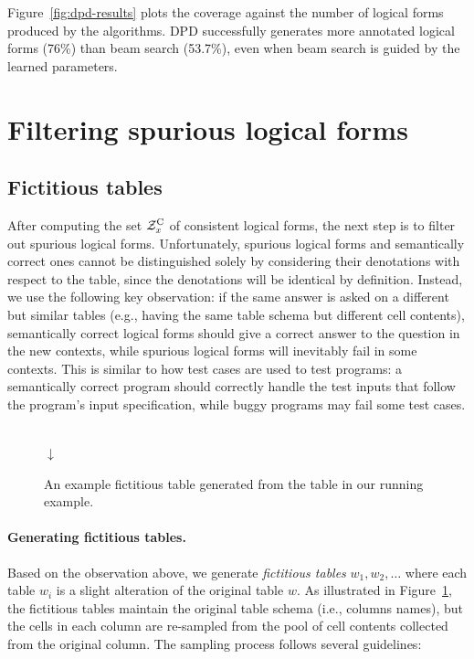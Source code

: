 Figure~\ref{fig:dpd-results}
plots the coverage against the number of logical forms
produced by the algorithms.
DPD successfully generates more annotated logical forms
(76\%)
than beam search
(53.7\%),
even when beam search is guided by the learned parameters.

\section{Filtering spurious logical forms}


\subsection{Fictitious tables}
After computing the set $\mathcal{Z}^\mathrm{C}_x$ of consistent logical forms,
the next step is to filter out spurious logical forms.
Unfortunately,
spurious logical forms and semantically correct ones
cannot be distinguished solely by considering their denotations
with respect to the table,
since the denotations will be identical by definition.
Instead, we use the following key observation:
if the same answer is asked on a different but similar tables
(e.g., having the same table schema but different cell contents),
semantically correct logical forms should give
a correct answer to the question in the new contexts,
while spurious logical forms will inevitably
fail in some contexts.
This is similar to how test cases are used to test programs:
a semantically correct program should correctly handle
the test inputs that follow the program's input specification,
while buggy programs may fail some test cases.

\begin{figure}[t]
\centering
\\[.5em]$\downarrow$\\[.5em]

\caption[
An example fictitious table.
]{
An example fictitious table generated from the table
in our running example.
}
\label{fig:fictitious-table}
\end{figure}

\paragraph{Generating fictitious tables.}
Based on the observation above,
we generate \emph{fictitious tables}
$w_1, w_2, \dots$ where each table $w_i$ is a slight
alteration of the original table $w$.
As illustrated in Figure~\ref{fig:fictitious-table},
the fictitious tables
maintain the original table schema (i.e., columns names),
but the cells in each column are re-sampled
from the pool of cell contents collected from
the original column.
The sampling process follows several guidelines:

